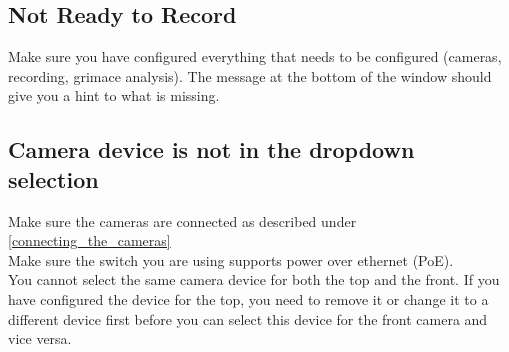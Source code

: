 \subsection{Not Ready to Record}
Make sure you have configured everything that needs to be configured (cameras, recording, grimace analysis).
The message at the bottom of the window should give you a hint to what is missing.

\subsection{Camera device is not in the dropdown selection}
Make sure the cameras are connected as described under \ref{connecting_the_cameras}\\
Make sure the switch you are using supports power over ethernet (PoE).\\
You cannot select the same camera device for both the top and the front. If you have configured the device for the top, you need to remove it or change it to a different device first before you can select this device for the front camera and vice versa.
